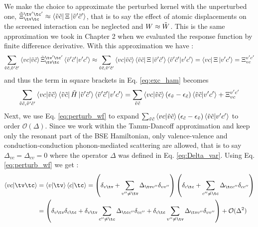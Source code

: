 We make the choice to approximate the perturbed kernel with the unperturbed one, $\tilde{\Xi}_{\tv\tc}^{\tv'\tc'} \approx \bra{\Tilde{v}\Tilde{c}} \Xi \ket{\Tilde{v}'\Tilde{c}'}$, that is to say the effect of atomic displacements on the screened interaction can be neglected and $W \approx \Tilde{W}$. This is the same approximation we took in Chapter 2 when we evaluated the response function by finite difference derivative.\cite{lechifflart2022excitons,paleari2019exciton,cannuccia2019theory} With this approximation we have :
\begin{equation}
    \sum_{\Tilde{v}\Tilde{c},\Tilde{v}'\Tilde{c}'} \bra{vc}\ket{\Tilde{v}\Tilde{c}} \tilde{\Xi}_{\tv\tc}^{\tv'\tc'} \bra{\Tilde{v}'\Tilde{c}'}\ket{v'c'} 
    \approx  \sum_{\Tilde{v}\Tilde{c},\Tilde{v}'\Tilde{c}'} \bra{vc}\ket{\Tilde{v}\Tilde{c}} 
    \bra{\Tilde{v}\Tilde{c}} \Xi \ket{\Tilde{v}'\Tilde{c}'}\bra{\Tilde{v}'\Tilde{c}'}\ket{v'c'} = \bra{vc} \Xi \ket{v'c'} = \Xi_{vc}^{v'c'}
\end{equation}
and thus the term in square brackets in Eq. \eqref{eq:exc_ham} becomes 
\begin{equation}
    \sum_{\Tilde{v}\Tilde{c},\Tilde{v}'\Tilde{c}'} \bra{vc}\ket{\Tilde{v}\Tilde{c}}  \bra{\Tilde{v}\Tilde{c}} \Tilde{H} \ket{\Tilde{v}'\Tilde{c}'} \bra{\Tilde{v}'\Tilde{c}'}\ket{v'c'} = \sum_{\Tilde{v}\Tilde{c}} \bra{vc}\ket{\Tilde{v}\Tilde{c}} (\epsilon_{\Tilde{v}} - \epsilon_{\Tilde{c}}) \bra{\Tilde{v}\Tilde{c}}\ket{v'c'} +  \Xi_{vc}^{v'c'} 
\end{equation}
Next, we use Eq. \eqref{eq:perturb_wf} to expand $\sum_{\Tilde{v}\tilde{c}} \bra{vc}\ket{\Tilde{v}\Tilde{c}} (\epsilon_{\Tilde{c}} - \epsilon_{\Tilde{v}})\bra{\Tilde{v}\Tilde{c}}\ket{v'c'}$ to order $\mathcal{O}(\Delta)$. Since we work within the Tamm-Dancoff approximation and keep only the resonant part of the BSE Hamiltonian, only valence-valence and conduction-conduction phonon-mediated scattering are allowed, that is to say $\Delta_{vc} = \Delta_{cv} = 0$ where the operator $\Delta$ was defined in Eq. \eqref{eq:Delta_var}. Using Eq. \eqref{eq:perturb_wf} we get :
\begin{align}
\begin{split}
    \bra{vc}\ket{\tv\tc} &= \bra{v}\ket{\tv}\bra{c}\ket{\tc} = \left(\delta_{v\tv} + \sum_{v''\neq\tv}\Delta_{\tv v''}\delta_{vv''}\right) \left(\delta_{c\tc} + \sum_{c''\neq \tc}\Delta_{\tc c''}\delta_{cc''}\right) \\
    &= \left( \delta_{v\tv}\delta_{c\tc} + \delta_{v\tv} \sum_{c''\neq\tc} \Delta_{\tc c''}\delta_{cc''} + \delta_{c\tc}\sum_{v''\neq \tv} \Delta_{\tv v''} \delta_{vv''} \right) + \mathcal{O}(\Delta^2)
\end{split}
\end{align}
